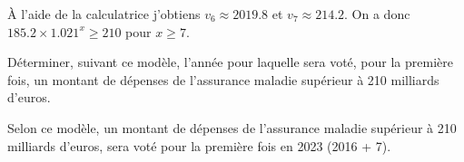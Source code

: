\begin{questions}
	\begin{solution}
		\`A l'aide de la calculatrice j'obtiens $v_6 \approx \num{2019.8}$ et $v_7 \approx \num{214.2}$. On a donc $\num{185.2} \times \num{1.021}^x \ge \num{210}$ pour $x \ge 7$. 
	\end{solution}
	
	\question Déterminer, suivant ce modèle, l'année pour laquelle sera voté, pour la première fois, un montant de dépenses de l'assurance maladie supérieur à 210 milliards d'euros. 
	
	\begin{solution}
		Selon ce modèle, un montant de dépenses de l'assurance maladie supérieur à 210 milliards d'euros, sera voté pour la première fois en 2023 (2016 + 7).
	\end{solution}
\end{questions}
